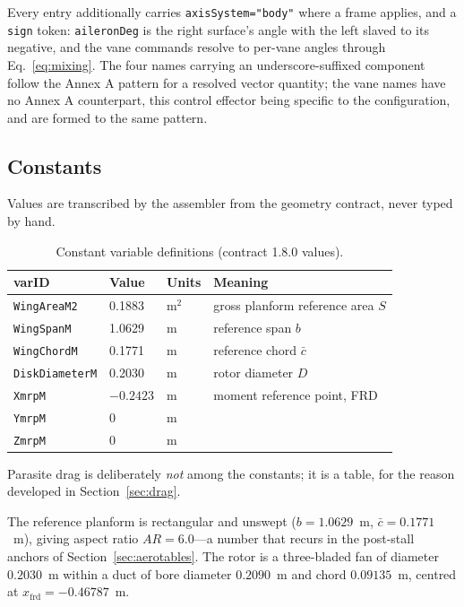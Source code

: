 \documentclass[11pt,a4paper]{article}
\newcommand{\varid}[1]{\texttt{\small #1}}
\begin{document}
\noindent
Every entry additionally carries \texttt{axisSystem="body"} where a frame
applies, and a \texttt{sign} token: \varid{aileronDeg} is the right
surface's angle with the left slaved to its negative, and the vane
commands resolve to per-vane angles through Eq.~\eqref{eq:mixing}. The
four names carrying an underscore-suffixed component follow the Annex A
pattern for a resolved vector quantity; the vane names have no Annex A
counterpart, this control effector being specific to the configuration,
and are formed to the same pattern.

\subsection{Constants}

Values are transcribed by the assembler from the geometry contract, never
typed by hand.

\begin{table}[htbp]
\centering
\caption{Constant variable definitions (contract 1.8.0 values).}
\label{tab:constants}
\begin{tabular}{@{}llll@{}}
\toprule
\textbf{varID} & \textbf{Value} & \textbf{Units} & \textbf{Meaning} \\
\midrule
\varid{WingAreaM2} & 0.1883 & m$^2$ & gross planform reference area $S$ \\
\varid{WingSpanM} & 1.0629 & m & reference span $b$ \\
\varid{WingChordM} & 0.1771 & m & reference chord $\bar c$ \\
\varid{DiskDiameterM} & 0.2030 & m & rotor diameter $D$ \\
\varid{XmrpM} & $-0.2423$ & m & moment reference point, FRD \\
\varid{YmrpM} & 0 & m & \\
\varid{ZmrpM} & 0 & m & \\
\bottomrule
\end{tabular}
\end{table}

\noindent
Parasite drag is deliberately \emph{not} among the constants; it is a
table, for the reason developed in Section~\ref{sec:drag}.

The reference planform is rectangular and unswept ($b = 1.0629$~m,
$\bar c = 0.1771$~m), giving aspect ratio $A\!R = 6.0$---a number that
recurs in the post-stall anchors of Section~\ref{sec:aerotables}. The
rotor is a three-bladed fan of diameter $0.2030$~m within a duct of bore
diameter $0.2090$~m and chord $0.09135$~m, centred at
$x_{\mathrm{frd}} = -0.46787$~m.
\end{document}

